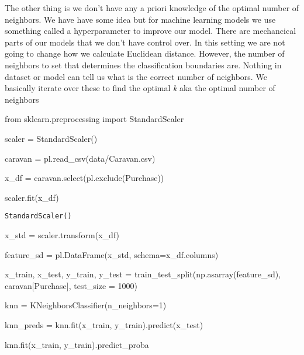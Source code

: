 \documentclass[
  letterpaper,
  DIV=11,
  numbers=noendperiod]{scrreprt}
\newenvironment{Shaded}{\begin{snugshade}}{\end{snugshade}}
\newcommand{\DecValTok}[1]{\textcolor[rgb]{0.68,0.00,0.00}{#1}}
\newcommand{\ImportTok}[1]{\textcolor[rgb]{0.00,0.46,0.62}{#1}}
\newcommand{\NormalTok}[1]{\textcolor[rgb]{0.00,0.23,0.31}{#1}}
\newcommand{\OperatorTok}[1]{\textcolor[rgb]{0.37,0.37,0.37}{#1}}
\newcommand{\StringTok}[1]{\textcolor[rgb]{0.13,0.47,0.30}{#1}}
\begin{document}
The other thing is we don't have any a priori knowledge of the optimal
number of neighbors. We have have some idea but for machine learning
models we use something called a hyperparameter to improve our model.
There are mechancical parts of our models that we don't have control
over. In this setting we are not going to change how we calculate
Euclidean distance. However, the number of neighbors to set that
determines the classification boundaries are. Nothing in dataset or
model can tell us what is the correct number of neighbors. We basically
iterate over these to find the optimal \emph{k} aka the optimal number
of neighbors

\begin{Shaded}
\begin{Highlighting}[]
\ImportTok{from}\NormalTok{ sklearn.preprocessing }\ImportTok{import}\NormalTok{ StandardScaler}

\NormalTok{scaler }\OperatorTok{=}\NormalTok{ StandardScaler()}

\NormalTok{caravan }\OperatorTok{=}\NormalTok{ pl.read\_csv(}\StringTok{\textquotesingle{}data/Caravan.csv\textquotesingle{}}\NormalTok{)}

\NormalTok{x\_df }\OperatorTok{=}\NormalTok{ caravan.select(pl.exclude(}\StringTok{\textquotesingle{}Purchase\textquotesingle{}}\NormalTok{))}

\NormalTok{scaler.fit(x\_df)}
\end{Highlighting}
\end{Shaded}

\begin{verbatim}
StandardScaler()
\end{verbatim}

\begin{Shaded}
\begin{Highlighting}[]
\NormalTok{x\_std }\OperatorTok{=}\NormalTok{ scaler.transform(x\_df)}

\NormalTok{feature\_sd }\OperatorTok{=}\NormalTok{ pl.DataFrame(x\_std, schema}\OperatorTok{=}\NormalTok{x\_df.columns)}


\NormalTok{x\_train, x\_test, y\_train, y\_test }\OperatorTok{=}\NormalTok{ train\_test\_split(np.asarray(feature\_sd),}
\NormalTok{                                                    caravan[}\StringTok{\textquotesingle{}Purchase\textquotesingle{}}\NormalTok{],}
\NormalTok{                                                    test\_size }\OperatorTok{=} \DecValTok{1000}\NormalTok{)}


\NormalTok{knn }\OperatorTok{=}\NormalTok{ KNeighborsClassifier(n\_neighbors}\OperatorTok{=}\DecValTok{1}\NormalTok{)}

\NormalTok{knn\_preds }\OperatorTok{=}\NormalTok{ knn.fit(x\_train, y\_train).predict(x\_test)}

\NormalTok{knn.fit(x\_train, y\_train).predict\_proba}
\end{Highlighting}
\end{Shaded}
\end{document}
